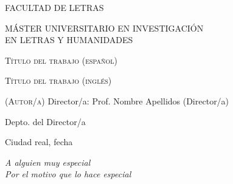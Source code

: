 \begin{titlepage}
    \par\noindent{}
        \hfill{}
        \vspace{1cm}
    \begin{center}
        {\par\Large FACULTAD DE LETRAS} 
        \vspace{1cm}
    {\par\textsc{MÁSTER UNIVERSITARIO EN INVESTIGACIÓN\\ 
    EN LETRAS Y HUMANIDADES}}
	\vfill
    {\huge\textsc{Título del trabajo (español)}}\par
    \bigskip
    \parbox{.6\linewidth}{}
    \bigskip
    \par{\Large\textsc{Título del trabajo (inglés)}}
    \par\vspace{2cm}
    \textsc{(Autor/a)}
    \medbreak
    Director/a: Prof. Nombre Apellidos (Director/a)\par
    Depto. del Director/a\par
    \vspace{4cm}
    \noindent%
    Ciudad real, fecha
    \end{center}
    \vfill
    \par\noindent\makebox[2.5in]{\hrulefill} \hfill\makebox[2.5in]{\hrulefill}%
    \par\noindent{}      
    \hfill{}%
\end{titlepage}


\null{}
\begin{flushright}
\emph{A alguien muy especial\\
Por el motivo que lo hace especial}
\end{flushright}
\null
\cleardoublepage